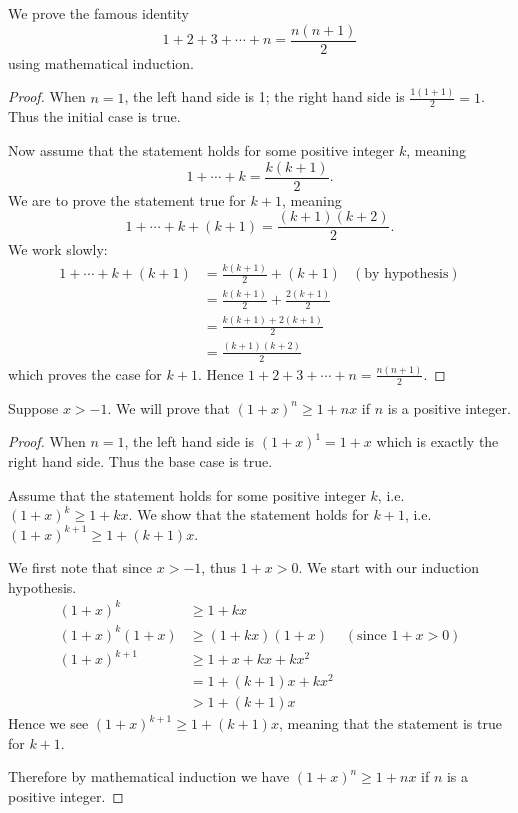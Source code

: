 \begin{example}
    We prove the famous identity
    \[
        1 + 2 + 3 + \cdots + n = \frac{n(n+1)}2
    \]
    using mathematical induction.
    \begin{proof}
        When $n = 1$, the left hand side is 1; the right hand side is $\frac{1(1+1)}{2} = 1$. Thus the initial case is true.

        Now assume that the statement holds for some positive integer $k$, meaning
        \[
            1 + \cdots + k = \frac{k(k+1)}2.
        \]
        We are to prove the statement true for $k+1$, meaning
        \[
            1 + \cdots + k + (k+1) = \frac{(k+1)(k+2)}2.
        \]
        We work slowly:
        \begin{align*}
            1 + \cdots + k + (k+1) &= \frac{k(k+1)}{2} + (k+1) & (\text{by hypothesis})\\
            &= \frac{k(k+1)}2 + \frac{2(k+1)}{2}\\
            &= \frac{k(k+1) + 2(k+1)}2\\
            &= \frac{(k+1)(k+2)}2
        \end{align*}
        which proves the case for $k + 1$. Hence $1 + 2 + 3 + \cdots + n = \frac{n(n+1)}2$.
    \end{proof}
\end{example}

\begin{example}
    Suppose $x > -1$. We will prove that $(1+x)^n \geq 1+nx$ if $n$ is a positive integer.
    \begin{proof}
        When $n = 1$, the left hand side is $(1+x)^1 = 1+x$ which is exactly the right hand side. Thus the base case is true.
        
        Assume that the statement holds for some positive integer $k$, i.e. $(1+x)^k \geq 1+kx$. We show that the statement holds for $k+1$, i.e. $(1+x)^{k+1} \geq 1+(k+1)x$.
        
        We first note that since $x>-1$, thus $1+x > 0$. We start with our induction hypothesis.
        \begin{align*}
            (1+x)^k &\geq 1+kx\\
            (1+x)^k(1+x) &\geq (1+kx)(1+x) & (\text{since }1+x > 0)\\
            (1+x)^{k+1} &\geq 1 + x + kx + kx^2\\
            &= 1+(k+1)x + kx^2\\
            &> 1+(k+1)x
        \end{align*}
        Hence we see $(1+x)^{k+1} \geq 1+(k+1)x$, meaning that the statement is true for $k+1$.
        
        Therefore by mathematical induction we have $(1+x)^n \geq 1+nx$ if $n$ is a positive integer.
    \end{proof}
\end{example}

